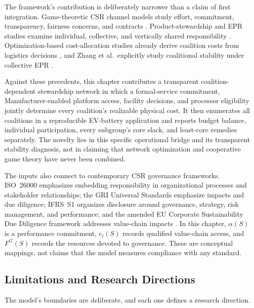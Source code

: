 The framework's contribution is deliberately narrower than a claim of first integration. Game-theoretic CSR channel models study effort, commitment, transparency, fairness concerns, and contracts \cite{Buccella2024,FantiBuccella2017,Ferrara2017,Khosroshahi2019,Mahdiraji2023}. Product-stewardship and EPR studies examine individual, collective, and vertically shared responsibility \cite{AtasuSubramanian2012,JacobsSubramanian2012,FleckingerGlachant2010}. Optimization-based cost-allocation studies already derive coalition costs from logistics decisions \cite{OzenerErgun2008,lozano2013cooperative,wang2023collaborative}, and Zhang et al.\ explicitly study coalitional stability under collective EPR \cite{ZhangCollectiveEPR2026}.

Against these precedents, this chapter contributes a transparent coalition-dependent stewardship network in which a formal-service commitment, Manufacturer-enabled platform access, facility decisions, and processor eligibility jointly determine every coalition's realizable physical cost. It then enumerates all coalitions in a reproducible EV-battery application and reports budget balance, individual participation, every subgroup's core slack, and least-core remedies separately. The novelty lies in this specific operational bridge and its transparent stability diagnosis, not in claiming that network optimization and cooperative game theory have never been combined.

The inputs also connect to contemporary CSR governance frameworks. ISO~26000 emphasizes embedding responsibility in organizational processes and stakeholder relationships; the GRI Universal Standards emphasize impacts and due diligence; IFRS~S1 organizes disclosure around governance, strategy, risk management, and performance; and the amended EU Corporate Sustainability Due Diligence framework addresses value-chain impacts \cite{ISO26000Official,GRIUniversalOfficial,IFRSS1Official,EUCSDDDOfficial}. In this chapter, $\alpha(S)$ is a performance commitment, $e_l(S)$ records qualified value-chain access, and $F^G(S)$ records the resources devoted to governance. These are conceptual mappings, not claims that the model measures compliance with any standard.

\subsection{Limitations and Research Directions}

The model's boundaries are deliberate, and each one defines a research direction.

